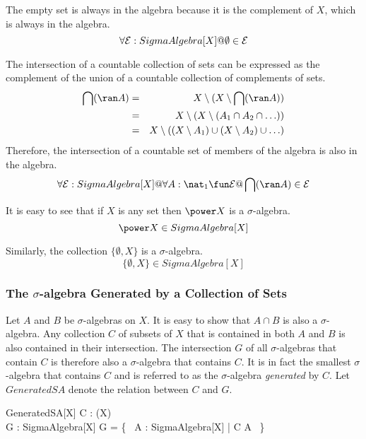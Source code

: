 \documentclass{article}
\begin{document}
The empty set is always in the algebra because it is the complement of $X$, which is always in the algebra.
\begin{equation}
	\forall {\cal E} : SigmaAlgebra[X] @ \emptyset \in {\cal E}
\end{equation}

The intersection of a countable collection of sets can be expressed as the complement of the union of a countable
collection of complements of sets.
\begin{eqnarray}
	\bigcap (\ran A)	& = & X \setminus (X \setminus \bigcap (\ran A)) \\
				& = & X \setminus (X \setminus (A_1 \cap A_2 \cap \ldots)) \nonumber \\
				& = & X \setminus ((X \setminus A_1) \cup (X \setminus A_2) \cup \ldots) \nonumber
\end{eqnarray}
Therefore, the intersection of a countable set of members of the algebra is also in the algebra.
\begin{equation}
	\forall \calE : SigmaAlgebra[X] @ \forall A : \nat_1 \fun \calE @ \bigcap (\ran A) \in \calE
\end{equation}

It is easy to see that if $X$ is any set then $\power X$ is a $\sigma$-algebra.
\begin{equation}
	\power X \in SigmaAlgebra[X]
\end{equation}

Similarly, the collection $\{ \emptyset, X \}$ is a $\sigma$-algebra.
\begin{equation}
	\{ \emptyset, X \} \in SigmaAlgebra[X]
\end{equation}

\subsubsection{The $\sigma$-algebra Generated by a Collection of Sets}

Let $A$ and $B$ be $\sigma$-algebras on $X$.
It is easy to show that $A \cap B$ is also a $\sigma$-algebra.
Any collection $C$ of subsets of $X$ that is contained in both $A$ and $B$ is also contained in their intersection.
The intersection $G$ of all $\sigma$-algebras that contain $C$ is therefore also a $\sigma$-algebra that contains $C$.
It is in fact the smallest $\sigma$-algebra that contains $C$ and is referred to as the $\sigma$-algebra {\it generated} by $C$.
Let $GeneratedSA$ denote the relation between $C$ and $G$.
\begin{schema}{GeneratedSA}[X]
	C : \power (\power X) \\
	G : SigmaAlgebra[X]
\where
	G = \bigcap \{~ A : SigmaAlgebra[X] | C \subseteq A ~\}
\end{schema}
\end{document}
